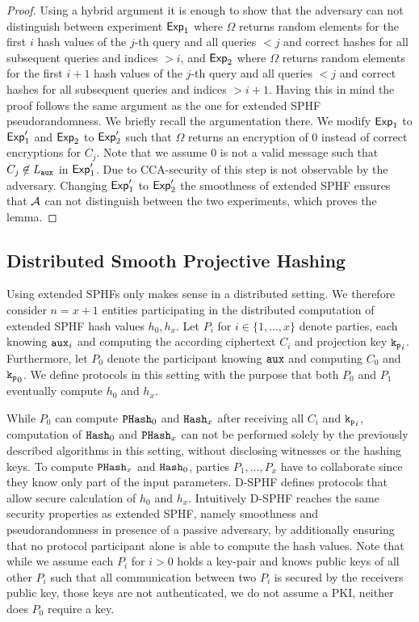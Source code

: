 \begin{proof}
Using a hybrid argument it is enough to show that the adversary can not distinguish between experiment $\mathsf{Exp}_1$ where $\Omega$ returns random elements for the first $i$ hash values of the $j$-th query and all queries $<j$ and correct hashes for all subsequent queries and indices $>i$, and $\mathsf{Exp}_2$ where $\Omega$ returns random elements for the first $i+1$ hash values of the $j$-th query and all queries $<j$ and correct hashes for all subsequent queries and indices $>i+1$.
Having this in mind the proof follows the same argument as the one for extended \ac{SPHF} pseudorandomness.
We briefly recall the argumentation there.
We modify $\mathsf{Exp}_1$ to $\mathsf{Exp}'_1$ and $\mathsf{Exp}_2$ to $\mathsf{Exp}'_2$ such that $\Omega$ returns an encryption of $0$ instead of correct encryptions for $C_j$.
Note that we assume $0$ is not a valid message such that $C_j\not\in L_\mathtt{aux}$ in $\mathsf{Exp}'_1$.
Due to \ac{CCA}-security of \cL this step is not observable by the adversary.
Changing $\mathsf{Exp}'_1$ to $\mathsf{Exp}'_2$ the smoothness of extended \ac{SPHF} ensures that $\mathcal{A}$ can not distinguish between the two experiments, which proves the lemma.
\end{proof}

\subsection{Distributed Smooth Projective Hashing}\label{sec:dsphf}
Using extended \acp{SPHF} only makes sense in a distributed setting.
We therefore consider $n=x+1$ entities participating in the distributed computation of extended \ac{SPHF} hash values $h_0,h_x$.
Let $P_i$ for $i\in\{1,\dots,x\}$ denote parties, each knowing $\mathtt{aux}_i$ and computing the according ciphertext $C_i$ and projection key $\mathtt{k_p}_i$.
Furthermore, let $P_0$ denote the participant knowing $\mathtt{aux}$ and computing $C_0$ and $\mathtt{k_p}_0$.
We define protocols in this setting with the purpose that both $P_0$ and $P_1$ eventually compute $h_0$ and $h_x$.

While $P_0$ can compute $\mathtt{PHash}_0$ and $\mathtt{Hash}_x$ after receiving all $C_i$ and $\mathtt{k_p}_i$, computation of $\mathtt{Hash}_0$ and $\mathtt{PHash}_x$ can not be performed solely by the previously described algorithms in this setting, without disclosing witnesses or the hashing keys.
To compute $\mathtt{PHash}_x$ and $\mathtt{Hash}_0$, parties $P_1,\dots,P_x$ have to collaborate since they know only part of the input parameters.
\ac{D-SPHF} defines protocols that allow secure calculation of $h_0$ and $h_x$.
Intuitively \ac{D-SPHF} reaches the same security properties as extended \ac{SPHF}, namely smoothness and pseudorandomness in presence of a passive adversary, by additionally ensuring that no protocol participant alone is able to compute the hash values.
Note that while we assume each $P_i$ for $i>0$ holds a key-pair and knows public keys of all other $P_i$ such that all communication between two $P_i$ is secured by the receivers public key, those keys are not authenticated, \ie we do not assume a \ac{PKI}, neither does $P_0$ require a key.


